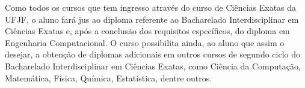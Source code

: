 Como todos os cursos que tem ingresso através do curso de Ciências Exatas da UFJF, o aluno fará jus ao diploma referente ao Bacharelado Interdisciplinar em Ciências Exatas e, após a conclusão dos requisitos específicos, do diploma em Engenharia Computacional. O curso possibilita ainda, ao aluno que assim o desejar,  a obtenção de diplomas adicionais em outros cursos de segundo ciclo do  Bacharelado Interdisciplinar em Ciências Exatas, como Ciência da Computação, Matemática, Física, Química, Estatística, dentre outros.



